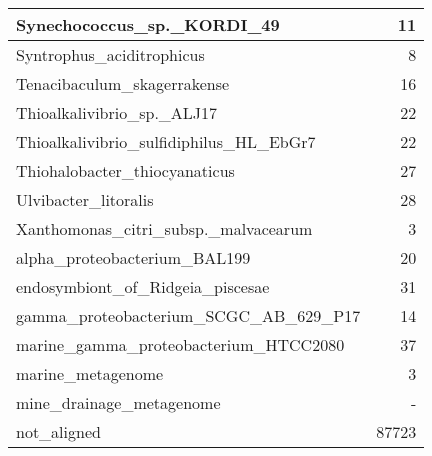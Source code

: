 \documentclass[12pt,a4paper]{article}
\begin{document}
\begin{table}[ht]
\begin{center}
\begin{tabular}{|l*{1}{|r}|}
Synechococcus\_sp.\_KORDI\_49 & 11 \\ \hline
Syntrophus\_aciditrophicus & 8 \\ \hline
Tenacibaculum\_skagerrakense & 16 \\ \hline
Thioalkalivibrio\_sp.\_ALJ17 & 22 \\ \hline
Thioalkalivibrio\_sulfidiphilus\_HL\_EbGr7 & 22 \\ \hline
Thiohalobacter\_thiocyanaticus & 27 \\ \hline
Ulvibacter\_litoralis & 28 \\ \hline
Xanthomonas\_citri\_subsp.\_malvacearum & 3 \\ \hline
alpha\_proteobacterium\_BAL199 & 20 \\ \hline
endosymbiont\_of\_Ridgeia\_piscesae & 31 \\ \hline
gamma\_proteobacterium\_SCGC\_AB\_629\_P17 & 14 \\ \hline
marine\_gamma\_proteobacterium\_HTCC2080 & 37 \\ \hline
marine\_metagenome & 3 \\ \hline
mine\_drainage\_metagenome & - \\ \hline
not\_aligned & 87723 \\ \hline
\end{tabular}
\end{center}
\end{table}
\end{document}
